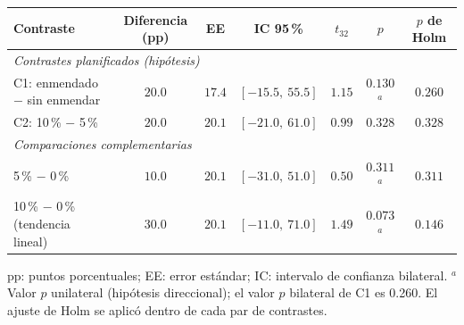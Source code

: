 \begin{tabular}{lcccccc}
\hline\hline
\textbf{Contraste} & \textbf{Diferencia (pp)} & \textbf{EE} & \textbf{IC 95\,\%} & \textbf{$t_{32}$} & \textbf{$p$} & \textbf{$p$ de Holm} \\
\hline
\multicolumn{7}{l}{\textit{Contrastes planificados (hip\'otesis)}} \\
C1: enmendado $-$ sin enmendar & $20.0$ & $17.4$ & $[-15.5,\ 55.5]$ & $1.15$ & $0.130$$^{a}$ & $0.260$ \\
C2: 10\,\% $-$ 5\,\% & $20.0$ & $20.1$ & $[-21.0,\ 61.0]$ & $0.99$ & $0.328$ & $0.328$ \\
\hline
\multicolumn{7}{l}{\textit{Comparaciones complementarias}} \\
5\,\% $-$ 0\,\% & $10.0$ & $20.1$ & $[-31.0,\ 51.0]$ & $0.50$ & $0.311$$^{a}$ & $0.311$ \\
10\,\% $-$ 0\,\% (tendencia lineal) & $30.0$ & $20.1$ & $[-11.0,\ 71.0]$ & $1.49$ & $0.073$$^{a}$ & $0.146$ \\
\hline
\end{tabular}
\par\vspace{4pt}
\parbox{0.94\linewidth}{\footnotesize pp: puntos porcentuales; EE: error est\'andar; IC: intervalo de confianza bilateral. $^{a}$Valor $p$ unilateral (hip\'otesis direccional); el valor $p$ bilateral de C1 es 0.260. El ajuste de Holm se aplic\'o dentro de cada par de contrastes.}
